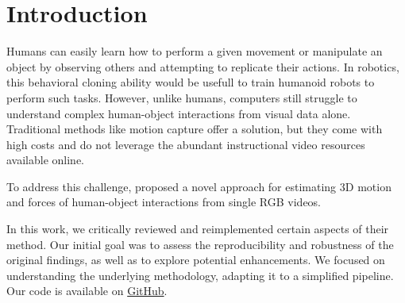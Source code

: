 \section{Introduction}
\label{sec:intro}

Humans can easily learn how to perform a given movement or manipulate an object by observing others and attempting to replicate their actions. 
In robotics, this behavioral cloning ability would be usefull to train humanoid robots to perform such tasks. 
However, unlike humans, computers still struggle to understand complex human-object interactions from visual data alone. 
Traditional methods like motion capture offer a solution, but they come with high costs and do not leverage the abundant instructional video 
resources available online.

To address this challenge, \citet{li2019estimating} proposed a novel approach for estimating 3D motion and forces of human-object interactions 
from single RGB videos. 

In this work, we critically reviewed and reimplemented certain aspects of their method. Our initial goal was to assess 
the reproducibility and robustness of the original findings, as well as to explore potential enhancements. We focused on understanding the 
underlying methodology, adapting it to a simplified pipeline. Our code is available on 
\href{https://github.com/balthazarneveu/monocular_pose_and_forces_estimation}{GitHub}.


